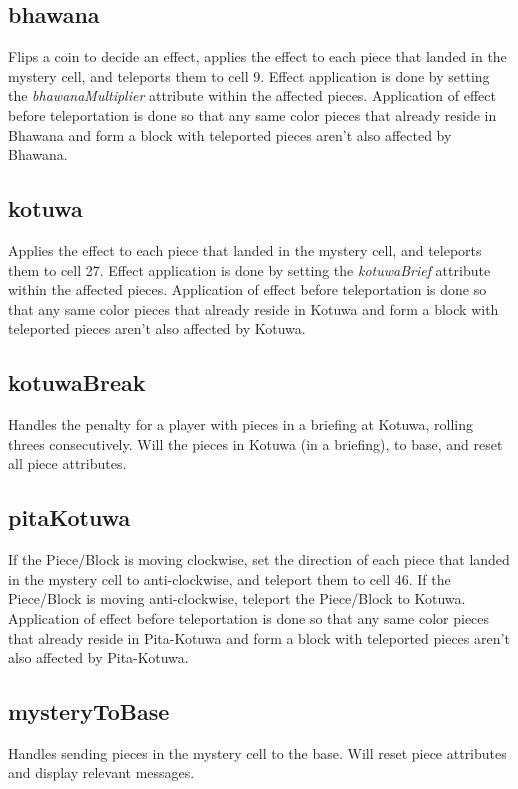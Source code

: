\documentclass{article}
\begin{document}
\subsection{bhawana}
Flips a coin to decide an effect, applies the effect to each piece that landed in the mystery cell, and teleports them to cell 9. Effect application is done by setting the \textit{bhawanaMultiplier} attribute within the affected pieces. Application of effect before teleportation is done so that any same color pieces that already reside in Bhawana and form a block with teleported pieces aren't also affected by Bhawana.

\subsection{kotuwa}
Applies the effect to each piece that landed in the mystery cell, and teleports them to cell 27. Effect application is done by setting the \textit{kotuwaBrief} attribute within the affected pieces. Application of effect before teleportation is done so that any same color pieces that already reside in Kotuwa and form a block with teleported pieces aren't also affected by Kotuwa.

\subsection{kotuwaBreak}
Handles the penalty for a player with pieces in a briefing at Kotuwa, rolling threes consecutively. Will the pieces in Kotuwa (in a briefing), to base, and reset all piece attributes.

\subsection{pitaKotuwa}
If the Piece/Block is moving clockwise, set the direction of each piece that landed in the mystery cell to anti-clockwise, and teleport them to cell 46. 
If the Piece/Block is moving anti-clockwise, teleport the Piece/Block to Kotuwa. Application of effect before teleportation is done so that any same color pieces that already reside in Pita-Kotuwa and form a block with teleported pieces aren't also affected by Pita-Kotuwa.

\subsection{mysteryToBase}
Handles sending pieces in the mystery cell to the base. Will reset piece attributes and display relevant messages.
\end{document}
